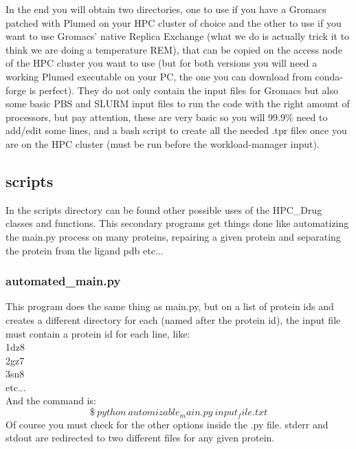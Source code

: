 					In the end you will obtain two directories, one to use if you have a Gromacs\cite{gromacs_ABRAHAM201519} patched with Plumed\cite{plumed} on your HPC cluster of choice and the other to use if you want to use Gromacs' native Replica Exchange (what we do is actually trick it to think we are doing a temperature REM), that can be copied on the access node of the HPC cluster you want to use (but for both versions you will need a working Plumed executable on your PC, the one you can download from conda-forge is perfect). They do not only contain the input files for Gromacs but also some basic PBS and SLURM input files to run the code with the right amount of processors, but pay attention, these are very basic so you will 99.9\% need to add/edit some lines, and a bash script to create all the needed .tpr files once you are on the HPC cluster (must be run before the workload-manager input).
				
	\subsection{scripts}
	
		In the scripts directory can be found other possible uses of the HPC\_Drug classes and functions. This secondary programs get things done like automatizing the main.py process on many proteins, repairing a given protein and separating the protein from the ligand pdb etc...
		
		\subsubsection{automated\_main.py}
		
			This program does the same thing as main.py, but on a list of protein ids and creates a different directory for each (named after the protein id), the input file must contain a protein id for each line, like:\\
			1dz8\\
			2gz7\\
			3sn8\\
			etc...\\
			$ $\\
			And the command is:
			\[
			\$\ python\ automizable_main.py\ input_file.txt
			\]
			Of course you must check for the other options inside the .py file. stderr and stdout are redirected to two different files for any given protein.
				